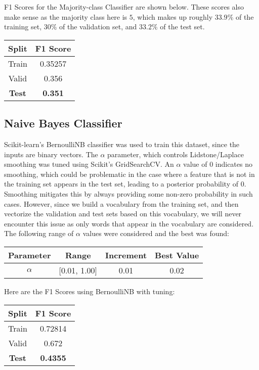 \documentclass{article}
\begin{document}
F1 Scores for the Majority-class Classifier are shown below. These scores also make sense as  the majority class here is \(5\), which makes up roughly \(33.9\%\) of the training set, \(30\%\) of the validation set, and \(33.2\%\) of the test set.

\begin{center}
\begin{tabular}{ |c|c| } 
	\hline
	\textbf{Split} & \textbf{F1 Score} \\ 
	\hline
	Train & 0.35257 \\
	Valid & 0.356 \\ 
	\textbf{Test} & \textbf{0.351} \\
	\hline
\end{tabular}
\end{center}

\subsection{Naive Bayes Classifier}
Scikit-learn's BernoulliNB classifier was used to train this dataset, since the inputs are binary vectors. The \(\alpha\) parameter, which controls Lidstone/Laplace smoothing was tuned using Scikit's GridSearchCV. An \(\alpha\) value of 0 indicates no smoothing, which could be problematic in the case where a feature that is not in the training set appears in the test set, leading to a posterior probability of 0. Smoothing mitigates this by always providing some non-zero probability in such cases. However, since we build a vocabulary from the training set, and then vectorize the validation and test sets based on this vocabulary, we will never encounter this issue as only words that appear in the vocabulary are considered. The following range of \(\alpha\) values were considered and the best was found:

\begin{center}
\begin{tabular}{ |c|c|c|c| } 
	\hline
	\textbf{Parameter} & \textbf{Range} & \textbf{Increment} & \textbf{Best Value} \\ 
	\hline
	\(\alpha\) & [0.01, 1.00] & 0.01 & 0.02 \\
	\hline
\end{tabular}
\end{center}

Here are the F1 Scores using BernoulliNB with tuning:

\begin{center}
\begin{tabular}{ |c|c| } 
	\hline
	\textbf{Split} & \textbf{F1 Score} \\ 
	\hline
	Train & 0.72814 \\
	Valid & 0.672 \\ 
	\textbf{Test} & \textbf{0.4355} \\
	\hline
\end{tabular}
\end{center}
\end{document}
